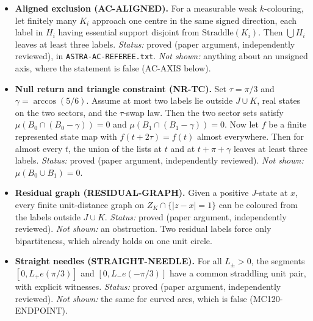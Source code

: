 \documentclass[11pt]{article}
\theoremstyle{definition}
\theoremstyle{remark}
\begin{document}
\begin{itemize}
\item \textbf{Aligned exclusion (AC-ALIGNED).}
For a measurable weak $k$-colouring, let finitely many $K_i$ approach one
centre in the same signed direction, each label in $H_i$ having essential
support disjoint from $\mathrm{Straddle}(K_i)$. Then $\bigcup H_i$ leaves at
least three labels.
\emph{Status:} proved (paper argument, independently reviewed), in
\texttt{ASTRA-\allowbreak{}AC-\allowbreak{}REFEREE.\allowbreak{}txt}.
\emph{Not shown:} anything about an unsigned axis, where the statement is
false (AC-AXIS below).

\item \textbf{Null return and triangle constraint (NR-TC).}
Set $\tau=\pi/3$ and $\gamma=\arccos(5/6)$. Assume at most two labels lie
outside $J\cup K$, real states on the two sectors, and the $\tau$-swap law.
Then the two sector sets satisfy $\mu(B_0\cap(B_0-\gamma))=0$ and
$\mu(B_1\cap(B_1-\gamma))=0$. Now let $f$ be a finite represented state map
with $f(t+2\tau)=f(t)$ almost everywhere. Then for almost every $t$, the union
of the lists at $t$ and at $t+\pi+\gamma$ leaves at least three labels.
\emph{Status:} proved (paper argument, independently reviewed).
\emph{Not shown:} $\mu(B_0\cup B_1)=0$.

\item \textbf{Residual graph (RESIDUAL-GRAPH).}
Given a positive $J$-state at $x$, every finite unit-distance graph on
$Z_K\cap\{|z-x|=1\}$ can be coloured from the labels outside $J\cup K$.
\emph{Status:} proved (paper argument, independently reviewed).
\emph{Not shown:} an obstruction. Two residual labels force only
bipartiteness, which already holds on one unit circle.

\item \textbf{Straight needles (STRAIGHT-NEEDLE).}
For all $L_\pm>0$, the segments $[0,L_+e(\pi/3)]$ and $[0,L_-e(-\pi/3)]$ have
a common straddling unit pair, with explicit witnesses. \emph{Status:} proved
(paper argument, independently reviewed). \emph{Not shown:} the same for
curved arcs, which is false (MC120-ENDPOINT).


\end{itemize}
\end{document}
